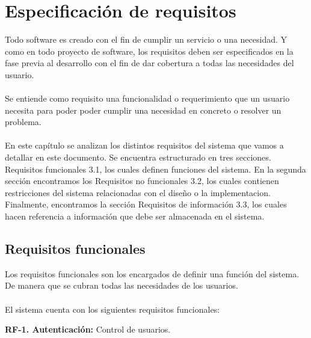 \chapter{Especificación de requisitos}

Todo software es creado con el fin de cumplir un servicio o una necesidad. Y como en todo proyecto de software, los requisitos deben ser especificados en la fase previa al desarrollo con el fin de dar cobertura a todas las necesidades del usuario.
\\
\\
Se entiende como requisito una funcionalidad o requerimiento que un usuario necesita para poder poder cumplir una necesidad en concreto o resolver un problema.
\\
\\
En este capítulo se analizan los distintos requisitos del sistema que vamos a detallar en este documento. Se encuentra estructurado en tres secciones. Requisitos funcionales 3.1, los cuales definen funciones del sistema. En la segunda sección encontramos los Requisitos no funcionales 3.2, los cuales contienen restricciones del sistema relacionadas con el diseño o la implementacion. Finalmente, encontramos la sección Requisitos de información 3.3, los cuales hacen referencia a información que debe ser almacenada en el sistema.

\section{Requisitos funcionales}

Los requisitos funcionales son los encargados de definir una función del sistema. De manera que se cubran todas las necesidades de los usuarios.\\
\\
El sistema cuenta con los siguientes requisitos funcionales:

\textbf{RF-1. Autenticación:} Control de usuarios.
\\

